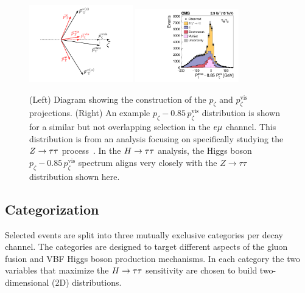 \begin{figure}[htbp]
\centering
     \includegraphics[width=0.4\textwidth]{higgs_to_taus/plots/pZeta_def.pdf}
     \includegraphics[width=0.4\textwidth]{higgs_to_taus/plots/htt_em_pZeta.pdf}\\
     \caption{
(Left) Diagram showing the construction of the $p_\zeta$ and $p_\zeta^{\text{vis}}$ projections.
(Right) An example $p_\zeta - 0.85 \, p_\zeta^{\text{vis}}$ distribution is shown for a similar but not
overlapping selection in the $e\mu$ channel.  This distribution is from an analysis focusing on specifically studying the
$Z\to\tau\tau$ process~\cite{Sirunyan:2018qio}.
In the $H\to\tau\tau$ analysis, the Higgs boson $p_\zeta - 0.85 \, p_\zeta^{\text{vis}}$
spectrum aligns very closely with the $Z\to\tau\tau$ distribution shown here.
     }
     \label{fig:htt_pZeta}
\end{figure}

\subsection{Categorization}
\label{sec:htt_categorization}

Selected events are split into three mutually exclusive categories per decay channel.
The categories are designed to target different aspects of the gluon fusion and VBF Higgs boson production mechanisms.
In each category the two variables that maximize the $H\to\tau\tau$ sensitivity are chosen to build 
two-dimensional (2D) distributions.


